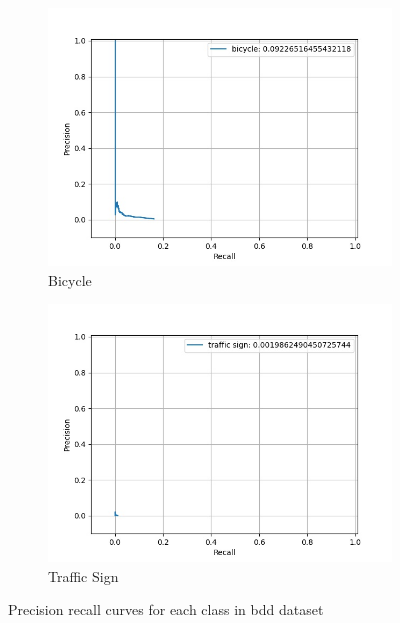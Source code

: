\begin{figure}
    
    	\begin{subfigure}[t]{0.325\textwidth}
    		\centering
    		\includegraphics[width=\textwidth]{images/basic_pr/class_bicycle_pr.jpg}
    		\caption{Bicycle}
    	\end{subfigure}
    	\begin{subfigure}[t]{0.325\textwidth}
    		\centering
    		\includegraphics[width=\textwidth]{images/basic_pr/class_traffic sign_pr.jpg}
    		\caption{Traffic Sign}
    	\end{subfigure}
    \caption[PR curves with vanilla prior boxes]{Precision recall curves for each class in \acrshort{bdd} dataset}
    \label{pr_basic}
    \end{figure}
    
